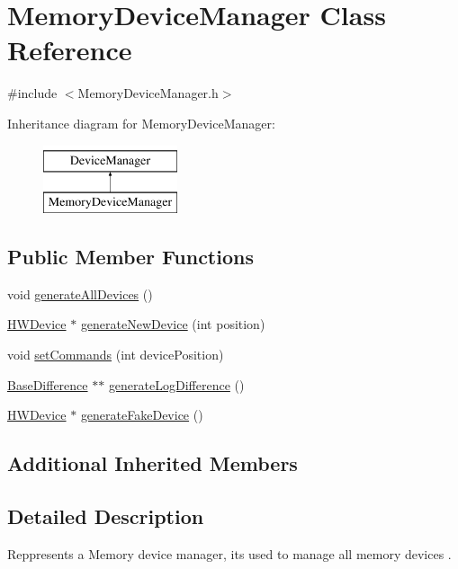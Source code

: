 \hypertarget{classMemoryDeviceManager}{}\section{Memory\+Device\+Manager Class Reference}
\label{classMemoryDeviceManager}


{\ttfamily \#include $<$Memory\+Device\+Manager.\+h$>$}

Inheritance diagram for Memory\+Device\+Manager\+:\begin{figure}[H]
\begin{center}
\leavevmode
\includegraphics[height=2.000000cm]{classMemoryDeviceManager}
\end{center}
\end{figure}
\subsection*{Public Member Functions}
\begin{DoxyCompactItemize}
\item 
void \hyperlink{classMemoryDeviceManager_a84565386d5d9ada62c495558ba7c06f8}{generate\+All\+Devices} ()
\item 
\hyperlink{classHWDevice}{H\+W\+Device} $\ast$ \hyperlink{classMemoryDeviceManager_a2fa6b078f50c4bfbbbef218b8289ee89}{generate\+New\+Device} (int position)
\item 
void \hyperlink{classMemoryDeviceManager_a0246a46d583a717dfabc625a5e387400}{set\+Commands} (int device\+Position)
\item 
\hyperlink{classBaseDifference}{Base\+Difference} $\ast$$\ast$ \hyperlink{classMemoryDeviceManager_a1462e426adfe44f815359fb7f8b096b1}{generate\+Log\+Difference} ()
\item 
\hyperlink{classHWDevice}{H\+W\+Device} $\ast$ \hyperlink{classMemoryDeviceManager_aa652b05bfea23ce4dbe562ed158fb165}{generate\+Fake\+Device} ()
\end{DoxyCompactItemize}
\subsection*{Additional Inherited Members}


\subsection{Detailed Description}
Reppresents a Memory device manager, it\textquotesingle{}s used to manage all memory devices . 

